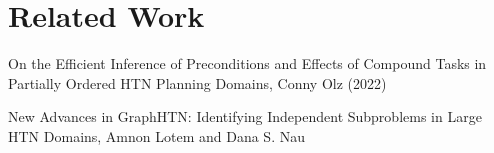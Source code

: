 \chapter{Related Work}\label{chap:relatedWork}

On the Efficient Inference of Preconditions and Effects of Compound Tasks in
Partially Ordered HTN Planning Domains, Conny Olz (2022)


New Advances in GraphHTN: Identifying Independent Subproblems in Large HTN Domains,
Amnon Lotem and Dana S. Nau 